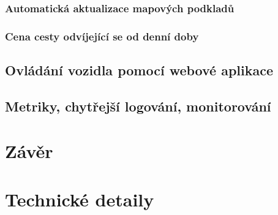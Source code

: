 \documentclass[czech,bachelor,dept460,male,cpp,cpdeclaration]{diploma}
\begin{document}
\subsubsection{Automatická aktualizace mapových podkladů}

\subsubsection{Cena cesty odvíjející se od denní doby}

\subsection{Ovládání vozidla pomocí webové aplikace} \label{web-app}

\subsection{Metriky, chytřejší logování, monitorování}

\section{Závěr}

\section{Technické detaily}
\end{document}
